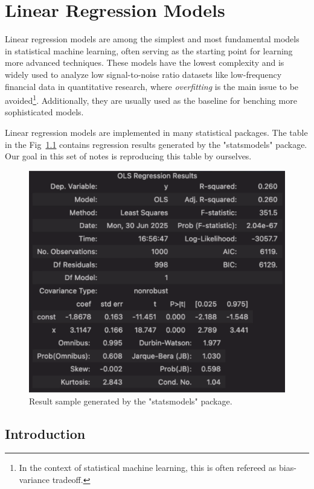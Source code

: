 \documentclass{book}
\begin{document}
\fi

\chapter{Linear Regression Models}

Linear regression models are among the simplest and most fundamental models in statistical machine learning, often serving as the starting point for learning more advanced techniques. These models have the lowest complexity and is widely used to analyze low signal-to-noise ratio datasets like low-frequency financial data in quantitative research, where \textit{overfitting} is the main issue to be avoided\footnote{In the context of statistical machine learning, this is often refereed as bias-variance tradeoff.}. Additionally, they are usually used as the baseline for benching more sophisticated models.

Linear regression models are implemented in many statistical packages. The table in the Fig~\ref{fig:LRM:statsmodels_results} contains regression results generated by the "statsmodels" package. Our goal in this set of notes is reproducing this table by ourselves.

\begin{figure}[htbp]
    \centering
    \includegraphics[width=0.5\linewidth]{figs/statsmodels_results.png}
    \caption{Result sample generated by the "statsmodels" package.}
    \label{fig:LRM:statsmodels_results}
\end{figure}

\section{Introduction}
\end{document}
